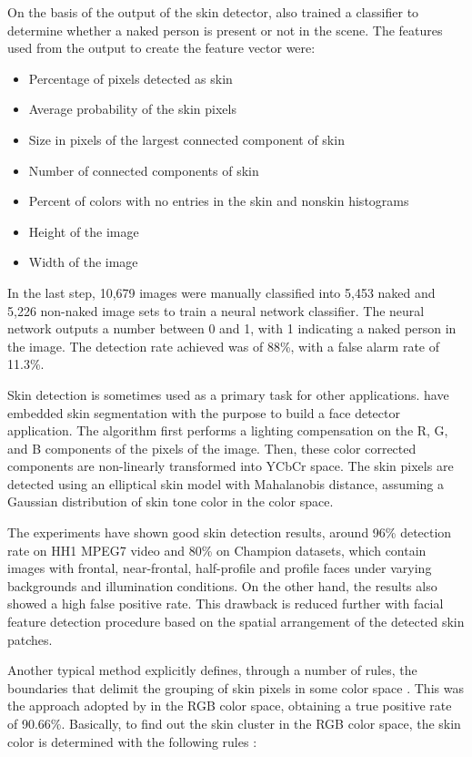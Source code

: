 On the basis of the output of the skin detector, \citet{jones:02} also trained a classifier to determine whether a naked person is present or not in the scene. The features used from the output to create the feature vector were:
\begin{itemize}
    \item Percentage of pixels detected as skin
    \item Average probability of the skin pixels
    \item Size in pixels of the largest connected component of skin
    \item Number of connected components of skin
    \item Percent of colors with no entries in the skin and nonskin histograms
    \item Height of the image
    \item Width of the image
\end{itemize}

In the last step, 10,679 images were manually classified into 5,453 naked and 5,226 non-naked image sets to train a neural network classifier. The neural network outputs a number between 0 and 1, with 1 indicating a naked person in the image. The detection rate achieved was of 88\%, with a false alarm rate of 11.3\%.

Skin detection is sometimes used as a primary task for other applications. \citet{hsu:02} have embedded skin segmentation with the purpose to build a face detector application. The algorithm first performs a lighting compensation on the R, G, and B components of the pixels of the image. Then, these color corrected components are non-linearly transformed into YCbCr space. The skin pixels are detected using an elliptical skin model with Mahalanobis distance, assuming a Gaussian distribution of skin tone color in the color space.

The experiments have shown good skin detection results, around 96\% detection rate on HH1 MPEG7 video and 80\% on Champion datasets, which contain images with frontal, near-frontal, half-profile and profile
faces under varying backgrounds and illumination conditions. On the other hand, the results also showed a high false positive rate. This drawback is reduced further with facial feature detection procedure based on the spatial arrangement of the detected skin patches.

Another typical method explicitly defines, through a number of rules, the boundaries that delimit the grouping of skin pixels in some color space \citep{vezhnevets:03}. This was the approach adopted by \citet{kovac:03} in the RGB color space, obtaining a true positive rate of 90.66\%. Basically, to find out the skin cluster in the RGB color space, the skin color is determined with the following rules \citep{kovac:03}:

